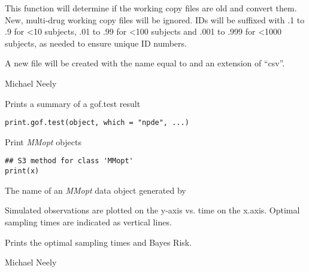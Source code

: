 \documentclass[a4paper]{book}
\begin{document}
%
\begin{Details}\relax
This function will determine if the working copy files are old and convert them.
New, multi-drug working copy files will be ignored. IDs will be suffixed with
.1 to .9 for <10 subjects, .01 to .99 for <100 subjects and .001 to .999 for <1000 subjects,
as needed to ensure unique ID numbers.
\end{Details}
%
\begin{Value}
A new file will be created with the name equal to  and
an extension of ``csv''.
\end{Value}
%
\begin{Author}\relax
Michael Neely
\end{Author}
%
\begin{Description}\relax
Prints a summary of a gof.test result
\end{Description}
%
\begin{Usage}
\begin{verbatim}
print.gof.test(object, which = "npde", ...)
\end{verbatim}
\end{Usage}
%
\begin{Description}\relax
Print \emph{MMopt} objects
\end{Description}
%
\begin{Usage}
\begin{verbatim}
## S3 method for class 'MMopt'
print(x)
\end{verbatim}
\end{Usage}
%
\begin{Arguments}
\begin{ldescription}
\item[\code{x}] The name of an \emph{MMopt} data object generated by 
\end{ldescription}
\end{Arguments}
%
\begin{Details}\relax
Simulated observations are plotted on the y-axis vs. time on the x.axis.  
Optimal sampling times are indicated as vertical lines.
\end{Details}
%
\begin{Value}
Prints the optimal sampling times and Bayes Risk.
\end{Value}
%
\begin{Author}\relax
Michael Neely
\end{Author}
\end{document}
